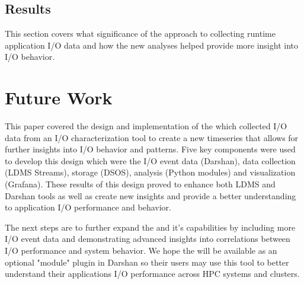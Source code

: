 \documentclass[conference]{IEEEtran}
\begin{document}
\subsection{Results}
This section covers what significance of the approach to collecting runtime application I/O data and how the new analyses helped provide more insight into I/O behavior.

\section{Future Work}
 This paper covered the \Darshan design and implementation of the \connector which collected I/O data from an I/O characterization tool to create a new timeseries that allows for further insights into I/O behavior and patterns. Five key components were used to develop this design which were the I/O event data (Darshan), data collection (LDMS Streams), storage (DSOS), analysis (Python modules) and visualization (Grafana).
These results of this design proved to enhance both LDMS and Darshan tools as well as create new insights and provide a better understanding to application I/O performance and behavior. 

The next steps are to further expand the \connector and it's capabilities by including more I/O event data and demonstrating advanced insights into correlations between I/O performance and system behavior. We hope the \Darshan will be available as an optional "module" plugin in Darshan so their users may use this tool to better understand their applications I/O performance across HPC systems and clusters. 





%
%
\end{document}
